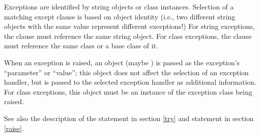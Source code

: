 Exceptions are identified by string objects or class instances.
Selection of a matching except clause is based on object identity
(i.e., two different string objects with the same value represent
different exceptions!)  For string exceptions, the 
clause must reference the same string object.  For class exceptions,
the  clause must reference the same class or a base
class of it.

When an exception is raised, an object (maybe ) is passed
as the exception's ``parameter'' or ``value''; this object does not
affect the selection of an exception handler, but is passed to the
selected exception handler as additional information.  For class
exceptions, this object must be an instance of the exception class
being raised.

See also the description of the  statement in section
\ref{try} and  statement in section \ref{raise}.
